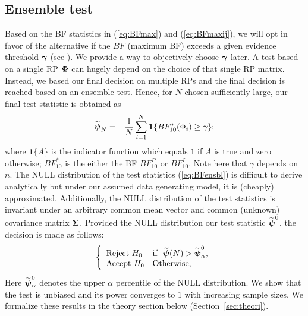 \documentclass[12pt]{article}
\theoremstyle{plain}%
\theoremstyle{definition}
\def\be{\begin{eqnarray}}
\def\ee{\end{eqnarray}}
\def\boldpsi{{\mbox{\boldmath $\psi$}}}
\def\bone{{\mathbf 1}}
\newcommand{\ugamma}            {\mbox{\boldmath$\gamma$}}
\newcommand{\uSigma}            {\mbox{\boldmath$\Sigma$}}
\newcommand{\uPhi}              {\mbox{\boldmath$\Phi$}}
\begin{document}
\subsection{Ensemble test} \label{sec:testens}
Based on the BF statistics in (\ref{eq:BFmax}) and (\ref{eq:BFmaxij}), we will opt in favor of the alternative if the $BF$ (maximum BF) exceeds a given evidence threshold $\ugamma$  (see \citealp{kass1995bayes}). We provide a way to objectively choose $\ugamma$ later. A test based on a single RP $\uPhi$ can hugely depend on the choice of that single RP matrix. Instead, we based our final decision on multiple RPs and the final decision is reached based on an ensemble test. Hence, for $N$ chosen sufficiently large, our final test statistic is obtained as
\be
\widetilde{\boldpsi}_{N} &=& \frac{1}{N}\sum^{N}_{i=1} \bone\{ BF^{*}_{10}(\Phi_i) \geq \gamma\}; \label{eq:BFensbl}
\ee
where $\bone\{A\}$ is the indicator function which equals $1$ if $A$ is true and zero otherwise; $BF^{*}_{10}$ is the either the BF $BF^{P}_{10}$ or $BF^{I}_{10}$. Note here that $\gamma$ depends on $n$. The NULL distribution of the test statistics (\ref{eq:BFensbl}) is difficult to derive analytically but under our assumed data generating model, it is (cheaply) approximated. Additionally, the NULL distribution of the test statistics is invariant under an arbitrary common mean vector and common (unknown) covariance matrix $\uSigma$. Provided the NULL distribution our test statistic $\widetilde{\boldpsi}^{0}$, the decision is made as follows:
\be
 \left \{
       \begin{array}{llll}
       \mbox{Reject}~ H_{0} & \mbox{if} ~~ \widetilde{\boldpsi}(N) > \widetilde{\boldpsi}^{0}_{\alpha},  \\
       \mbox{Accept}~ H_{0} & \mbox{Otherwise}, \label{eq:eqBFfin}
       \end{array}
       \right.
\ee
Here $\widetilde{\boldpsi}^{0}_{\alpha}$ denotes the upper $\alpha$ percentile of the NULL distribution.  
We show that the test is unbiased and its power converges to $1$ with increasing sample sizes. We formalize these results in the theory section below (Section~\ref{sec:theori}).  
\end{document}
